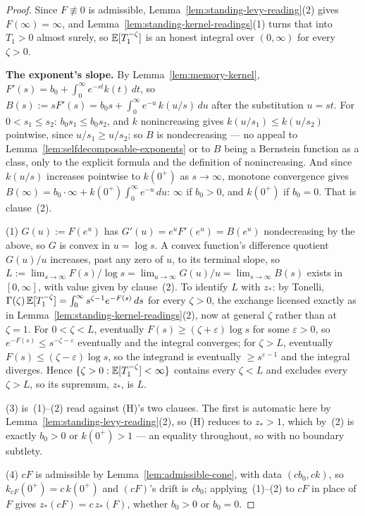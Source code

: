 \begin{proof}
Since $F \not\equiv 0$ is admissible, Lemma~\ref{lem:standing-levy-reading}(2) gives
$F(\infty) = \infty$, and Lemma~\ref{lem:standing-kernel-readings}(1) turns that into $T_1 > 0$
almost surely, so $\mathbb{E}[T_1^{-\zeta}]$ is an honest integral over $(0,\infty)$ for every
$\zeta > 0$.

\textbf{The exponent's slope.} By Lemma~\ref{lem:memory-kernel}, $F'(s) = b_0 + \int_0^\infty
e^{-st}k(t)\,dt$, so $B(s) := sF'(s) = b_0 s + \int_0^\infty e^{-u}\,k(u/s)\,du$ after the
substitution $u = st$. For $0 < s_1 \le s_2$: $b_0 s_1 \le b_0 s_2$, and $k$ nonincreasing gives
$k(u/s_1) \le k(u/s_2)$ pointwise, since $u/s_1 \ge u/s_2$; so $B$ is nondecreasing --- no appeal
to Lemma~\ref{lem:selfdecomposable-exponents} or to $B$ being a Bernstein function as a class,
only to the explicit formula and the definition of nonincreasing. And since $k(u/s)$ increases
pointwise to $k(0^+)$ as $s \to \infty$, monotone convergence gives
$B(\infty) = b_0\cdot\infty + k(0^+)\int_0^\infty e^{-u}\,du$: $\infty$ if $b_0 > 0$, and $k(0^+)$
if $b_0 = 0$. That is clause~(2).

(1) $G(u) := F(e^u)$ has $G'(u) = e^u F'(e^u) = B(e^u)$ nondecreasing by the above, so $G$ is
convex in $u = \log s$. A convex function's difference quotient $G(u)/u$ increases, past any zero
of $u$, to its terminal slope, so
$L := \lim_{s\to\infty} F(s)/\log s = \lim_{u\to\infty} G(u)/u = \lim_{s\to\infty} B(s)$ exists in
$[0,\infty]$, with value given by clause~(2). To identify $L$ with $z_*$: by Tonelli,
$\Gamma(\zeta)\,\mathbb{E}[T_1^{-\zeta}] = \int_0^\infty s^{\zeta-1}e^{-F(s)}\,ds$ for every $\zeta > 0$,
the exchange licensed exactly as in Lemma~\ref{lem:standing-kernel-readings}(2), now at general
$\zeta$ rather than at $\zeta = 1$. For $0 < \zeta < L$, eventually
$F(s) \ge (\zeta+\varepsilon)\log s$ for some $\varepsilon > 0$, so
$e^{-F(s)} \le s^{-\zeta-\varepsilon}$ eventually and the integral converges; for $\zeta > L$,
eventually $F(s) \le (\zeta - \varepsilon)\log s$, so the integrand is eventually
$\ge s^{\varepsilon - 1}$ and the integral diverges. Hence
$\{\zeta > 0 : \mathbb{E}[T_1^{-\zeta}] < \infty\}$ contains every $\zeta < L$ and excludes every
$\zeta > L$, so its supremum, $z_*$, is $L$.

(3) is~(1)--(2) read against (H)'s two clauses. The first is automatic here by
Lemma~\ref{lem:standing-levy-reading}(2), so (H) reduces to $z_* > 1$, which by~(2) is exactly
$b_0 > 0$ or $k(0^+) > 1$ --- an equality throughout, so with no boundary subtlety.

(4) $cF$ is admissible by Lemma~\ref{lem:admissible-cone}, with data $(cb_0, ck)$, so
$k_{cF}(0^+) = c\,k(0^+)$ and $(cF)$'s drift is $cb_0$; applying~(1)--(2) to $cF$ in place of $F$
gives $z_*(cF) = c\,z_*(F)$, whether $b_0 > 0$ or $b_0 = 0$.
\end{proof}

